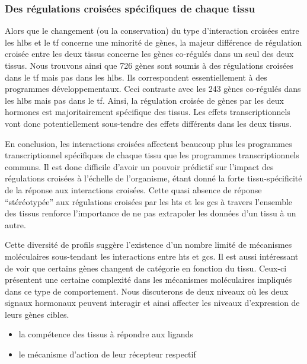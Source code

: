 \documentclass[../main.tex]{subfiles}
\begin{document}
		\subsubsection{Des régulations croisées spécifiques de chaque tissu}
			Alors que le changement (ou la conservation) du type d'interaction croisées entre les \glspl{hlb} et le \gls{tf} concerne une minorité de gènes, la majeur différence de régulation croisée entre les deux tissus concerne les gènes co-régulés dans un seul des deux tissus.
			Nous trouvons ainsi que 726 gènes sont soumis à des régulations croisées dans le \gls{tf} mais pas dans les \glspl{hlb}.
			Ils correspondent essentiellement à des programmes développementaux.
			Ceci contraste avec les 243 gènes co-régulés dans les \glspl{hlb} mais pas dans le \gls{tf}.
			Ainsi, la régulation croisée de gènes par les deux hormones est majoritairement spécifique des tissus.
			Les effets transcriptionnels vont donc potentiellement sous-tendre des effets différents dans les deux tissus.
		\\
		\par
		En conclusion, les interactions croisées affectent beaucoup plus les programmes transcriptionnel spécifiques de chaque tissu que les programmes transcriptionnels communs.
		Il est donc difficile d'avoir un pouvoir prédictif sur l'impact des régulations croisées à l'échelle de l'organisme, étant donné la forte tissu-spécificité de la réponse aux interactions croisées.
		Cette quasi absence de réponse ``stéréotypée'' aux régulations croisées par les \glspl{ht} et les \glspl{gc} à travers l'ensemble des tissus renforce l'importance de ne pas extrapoler les données d'un tissu à un autre.
		\par
		Cette diversité de profils suggère l'existence d'un nombre limité de mécanismes moléculaires sous-tendant les interactions entre \glspl{ht} et \glspl{gc}.
		Il est aussi intéressant de voir que certains gènes changent de catégorie en fonction du tissu.
		Ceux-ci présentent une certaine complexité dans les mécanismes moléculaires impliqués dans ce type de comportement.
		Nous discuterons de deux niveaux où les deux signaux hormonaux peuvent interagir et ainsi affecter les niveaux d'expression de leurs gènes cibles.
		\begin{itemize}
			\item
				la compétence des tissus à répondre aux ligands
			\item
				le mécanisme d'action de leur récepteur respectif
		\end{itemize}
\end{document}
